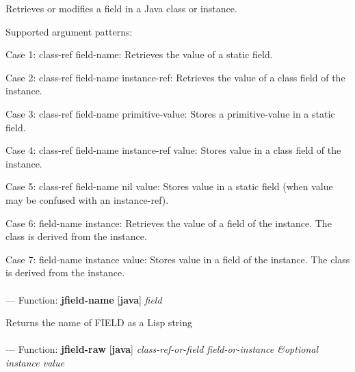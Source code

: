 \begin{adjustwidth}{5em}{5em}
Retrieves or modifies a field in a Java class or instance.

Supported argument patterns:

   Case 1: class-ref  field-name:
      Retrieves the value of a static field.

   Case 2: class-ref  field-name  instance-ref:
      Retrieves the value of a class field of the instance.

   Case 3: class-ref  field-name  primitive-value:
      Stores a primitive-value in a static field.

   Case 4: class-ref  field-name  instance-ref  value:
      Stores value in a class field of the instance.

   Case 5: class-ref  field-name  nil  value:
      Stores value in a static field (when value may be
      confused with an instance-ref).

   Case 6: field-name  instance:
      Retrieves the value of a field of the instance. The
      class is derived from the instance.

   Case 7: field-name  instance  value:
      Stores value in a field of the instance. The class is
      derived from the instance.


\end{adjustwidth}

\paragraph{}
\label{JAVA:JFIELD-NAME}
--- Function: \textbf{jfield-name} [\textbf{java}] \textit{field}

\begin{adjustwidth}{5em}{5em}
Returns the name of FIELD as a Lisp string
\end{adjustwidth}

\paragraph{}
\label{JAVA:JFIELD-RAW}
--- Function: \textbf{jfield-raw} [\textbf{java}] \textit{class-ref-or-field field-or-instance \&optional instance value}

